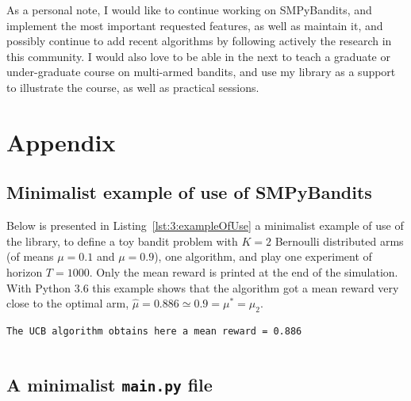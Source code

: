 As a personal note, I would like to continue working on SMPyBandits, and implement the most important requested features, as well as maintain it, and possibly continue to add recent algorithms by following actively the research in this community.
I would also love to be able in the next to teach a graduate or under-graduate course on multi-armed bandits, and use my library as a support to illustrate the course, as well as practical sessions.


\newpage  %
\section{Appendix}
\label{sec:3:appendix}


\subsection{Minimalist example of use of SMPyBandits}

Below is presented in Listing~\ref{lst:3:exampleOfUse} a minimalist example of use of the library, to define a toy bandit problem with $K=2$ Bernoulli distributed arms (of means $\mu=0.1$ and $\mu=0.9$), one \UCB{} algorithm, and play one experiment of horizon $T=1000$.
Only the mean reward is printed at the end of the simulation.
%
With Python 3.6 this example shows that the algorithm got a mean reward very close to the optimal arm, $\hat{\mu} = 0.886 \simeq 0.9 = \mu^* = \mu_2$.
\begin{verbatim}
The UCB algorithm obtains here a mean reward = 0.886
\end{verbatim}

\begin{small}
    \inputminted[linenos=true,numbersep=5pt,frame=lines,framesep=2mm]{python3}{2-Chapters/3-Chapter/src/example_of_use_of_SMPyBandits.py}
\end{small}


\subsection{A minimalist \texttt{main.py} file}

